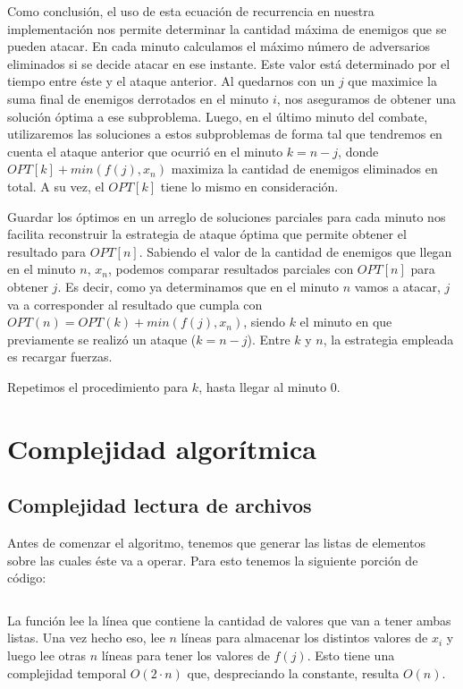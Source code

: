\documentclass{article}
\begin{document}
Como conclusión, el uso de esta ecuación de recurrencia en nuestra implementación nos permite determinar la cantidad máxima de enemigos que se pueden atacar. En cada minuto calculamos el  máximo número de adversarios eliminados si se decide atacar en ese instante. Este valor está determinado por el tiempo entre éste y el ataque anterior. Al quedarnos con un $j$ que maximice la suma final de enemigos derrotados en el minuto $i$, nos aseguramos de obtener una solución óptima a ese subproblema. Luego, en el último minuto del combate, utilizaremos las soluciones a estos subproblemas de forma tal que tendremos en cuenta el ataque anterior que ocurrió en el minuto $k = n - j$, donde $OPT[k] + min(f(j), x_n)$ maximiza la cantidad de enemigos eliminados en total. A su vez, el $OPT[k]$ tiene lo mismo en consideración. 

Guardar los óptimos en un arreglo de soluciones parciales para cada minuto nos facilita reconstruir la estrategia de ataque óptima que permite obtener el resultado para $OPT[n]$. Sabiendo el valor de la cantidad de enemigos que llegan en el minuto $n$, $x_n$, podemos comparar resultados parciales con $OPT[n]$ para obtener $j$. Es decir, como ya determinamos que en el minuto $n$ vamos a atacar, $j$ va a corresponder al resultado que cumpla con $OPT(n) = OPT(k) + min(f(j), x_n)$, siendo $k$ el minuto en que previamente se realizó un ataque ($k = n - j$). Entre $k$ y $n$, la estrategia empleada es recargar fuerzas.

Repetimos el procedimiento para $k$, hasta llegar al minuto 0. 

\section{Complejidad algorítmica}
\subsection{Complejidad lectura de archivos}
Antes de comenzar el algoritmo, tenemos que generar las listas de elementos sobre las cuales éste va a operar.
Para esto tenemos la siguiente porción de código:
\inputminted[linenos, firstline=5, lastline=27]{python}{codigo/archivos.py}

La función lee la línea que contiene la cantidad de valores que van a tener ambas listas. Una vez hecho eso, lee $n$ líneas para almacenar los distintos valores de $x_i$ y luego lee otras $n$ líneas para tener los valores de $f(j)$. Esto tiene una complejidad temporal $O(2\cdot n)$ que, despreciando la constante, resulta $O(n)$.
\end{document}
